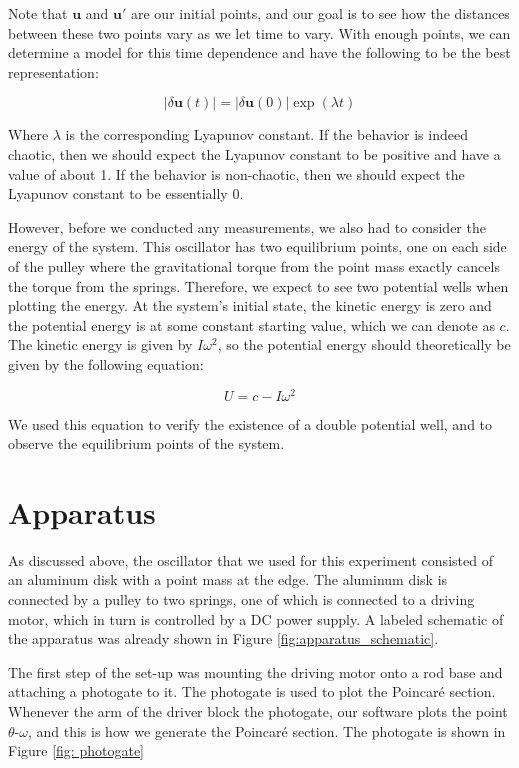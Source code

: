 \documentclass[twocolumn,amsmath,amssymb,pra, floatfix]{revtex4-2}
\begin{document}
Note that $\mathbf{u}$ and $\mathbf{u}'$ are our initial points, and our goal is to see how the distances between these two points vary as we let time to vary. With enough points, we can determine a model for this time dependence and have the following to be the best representation:

\begin{equation}
    \lvert \delta \mathbf{u}( t ) \rvert
    =
    \lvert \delta \mathbf{u}( 0 ) \rvert \exp(\lambda t)
    \label{eq:11}
\end{equation}

Where $\lambda$ is the corresponding Lyapunov constant. If the behavior is indeed chaotic, then we should expect the Lyapunov constant to be positive and have a value of about 1. If the behavior is non-chaotic, then we should expect the Lyapunov constant to be essentially 0.

However, before we conducted any measurements, we also had to consider the energy of the system. This oscillator has two equilibrium points, one on each side of the pulley where the gravitational torque from the point mass exactly cancels the torque from the springs. Therefore, we expect to see two potential wells when plotting the energy. At the system's initial state, the kinetic energy is zero and the potential energy is at some constant starting value, which we can denote as $c$. The kinetic energy is given by $I\omega^{2}$, so the potential energy should theoretically be given by the following equation:

\begin{equation}
    U = c - I\omega^{2}
    \label{eq:12}
\end{equation}

We used this equation to verify the existence of a double potential well, and to observe the equilibrium points of the system. 

\section{Apparatus}
As discussed above, the oscillator that we used for this experiment consisted of an aluminum disk with a point mass at the edge. The aluminum disk is connected by a pulley to two springs, one of which is connected to a driving motor, which in turn is controlled by a DC power supply. A labeled schematic of the apparatus was already shown in Figure \ref{fig:apparatus_schematic}.

The first step of the set-up was mounting the driving motor onto a rod base and attaching a photogate to it. The photogate is used to plot the Poincar\'{e} section. Whenever the arm of the driver block the photogate, our software plots the point $\theta$-$\omega$, and this is how we generate the Poincar\'{e} section. The photogate is shown in Figure \ref{fig: photogate}
\end{document}
